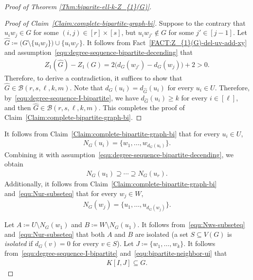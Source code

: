 \documentclass[11pt,a4paper]{article}
\begin{document}
\begin{proof}[Proof of Theorem \ref{Thm:biparite-ell-k-Z_{1}(G)}]
    \begin{proof}[Proof of Claim~\ref{Claim:complete-bipartite-graph-bi}]
    Suppose to the contrary that $u_iw_j \in G$ for some $(i,j) \in [r] \times [s]$, but $u_{i}w_{j'} \not\in G$ for some $j' \in [j-1]$.  
        Let $\hat{G} \coloneqq \big(G \setminus \{u_iw_j\}\big) \cup \{u_{i}w_{j'}\}$. 
        It follows from Fact~\ref{FACT:Z_{1}(G)-del-uv-add-xy} and assumption~\eqref{equ:degree-sequence-bipartite-decending} that 
        \begin{align*}
            Z_{1}(\hat{G}) - Z_{1}(G)
            = 2\big(d_{G}(w_{j'}) - d_{G}(w_j)\big) + 2 
            > 0. 
        \end{align*}
        Therefore, to derive a contradiction, it suffices to show that $\hat{G} \in \mathcal{B}(r,s,\ell,k,m)$. 
        Note that $d_{G}(u_i) = d_{\hat{G}}(u_i)$ for every $u_i \in U$. 
        Therefore, by~\eqref{equ:degree-sequence-I-bipartite}, we have $d_{\hat{G}}(u_i) \ge k$ for every $i \in [\ell]$, and then $\hat{G} \in \mathcal{B}(r,s,\ell,k,m)$. 
        This completes the proof of Claim~\ref{Claim:complete-bipartite-graph-bi}. 
    \end{proof}%

    It follows from Claim~\ref{Claim:complete-bipartite-graph-bi} that for every $u_i \in U$, 
    \begin{align}\label{equ:bipartite-neighbor-ui}
        N_{G}(u_i) = \big\{w_1, \ldots, w_{d_{G}(u_i)}\big\}. 
    \end{align}
    Combining it with assumption~\eqref{equ:degree-sequence-bipartite-decending}, we obtain 
    \begin{align}\label{equ:Nur-subseteq}
        N_{G}(u_1) \supseteq \cdots \supseteq N_{G}(u_{r}). 
    \end{align}
    Additionally, it follows from Claim~\ref{Claim:complete-bipartite-graph-bi} and~\eqref{equ:Nur-subseteq} that for every $w_j \in W$, 
    \begin{align}\label{equ:bipartite-neighbor-wj}
        N_{G}(w_j) = \big\{u_1, \ldots, u_{d_{G}(w_j)}\big\}. 
    \end{align}
    
    Let $A \coloneq U \setminus N_{G}(w_1)$ and $B \coloneq W \setminus N_{G}(u_1)$. 
    It follows from~\eqref{equ:Nws-subseteq} and~\eqref{equ:Nur-subseteq} that both $A$ and $B$ are isolated (a set $S \subseteq V(G)$ is \emph{isolated} if $d_{G}(v) = 0$ for every $v \in S$). 
    Let $J \coloneqq \{w_1, \ldots, w_{k}\}$. 
    It follows from~\eqref{equ:degree-sequence-I-bipartite} and~\eqref{equ:bipartite-neighbor-ui} that 
    \begin{align*}
        K[I, J] \subseteq G. 
    \end{align*}


\end{proof}
\end{document}
